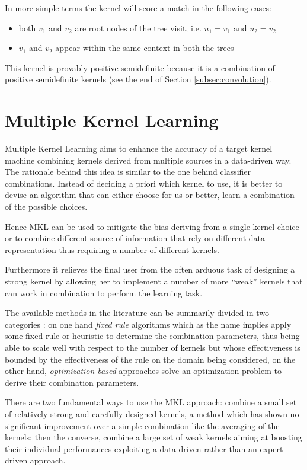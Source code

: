 In more simple terms the kernel will score a match in the following cases:
\begin{itemize}
    \item both $v_1$ and $v_2$ are root nodes of the tree visit, i.e. $u_1 = v_1$ and $u_2 = v_2$
    \item $v_1$ and $v_2$ appear within the same context in both the trees
\end{itemize}

This kernel is provably positive semidefinite because it is a combination of positive
semidefinite kernels (see the end of Section \ref{subsec:convolution}).

\section{Multiple Kernel Learning}
\label{subsec:mkl}
Multiple Kernel Learning aims to enhance the accuracy of a target kernel machine
combining kernels derived from multiple sources in a data-driven way.
The rationale behind this idea is similar to the one behind classifier combinations.
Instead of deciding a priori which kernel to use, it is better to devise an
algorithm that can either choose for us or better, learn a combination of the
possible choices.

Hence MKL can be used to mitigate the bias deriving from a single kernel choice
or to combine different source of information that rely on different data representation
thus requiring a number of different kernels.

Furthermore it relieves the final user from the often arduous task of designing
a strong kernel by allowing her to implement a number of more ``weak'' kernels
that can work in combination to perform the learning task.

The available methods in the literature can be summarily divided in two categories
\cite{journals/jmlr/GonenA11}: on one hand \emph{fixed rule} algorithms which as the name implies apply some fixed
rule or heuristic to determine the combination parameters, thus being able to scale
well with respect to the number of kernels but whose effectiveness is bounded by
the effectiveness of the rule on the domain being considered,
on the other hand, \emph{optimization based} approaches solve an optimization
problem to derive their combination parameters.

There are two fundamental ways to use the MKL approach: combine a small set of 
relatively strong and carefully designed kernels, a method which has shown no
significant improvement over a simple combination like the averaging of the kernels;
then the converse, combine a large set of weak kernels aiming at boosting their
individual performances exploiting a data driven rather than an expert driven
approach.

